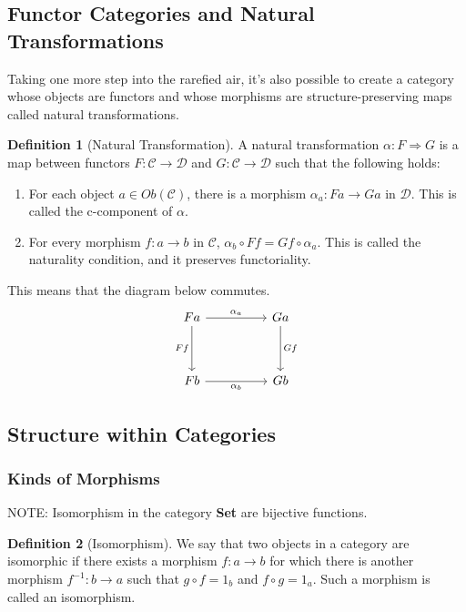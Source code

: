 \documentclass{article}
\theoremstyle{definition}
\newtheorem{definition}{Definition}
\begin{document}
\subsection*{Functor Categories and Natural Transformations}
Taking one more step into the rarefied air, it's also possible to create a category whose objects are functors and whose morphisms are structure-preserving maps called natural transformations.
\begin{definition}[Natural Transformation]
    A natural transformation $\alpha :F\Rightarrow G$ is a map between functors $F:\mathcal{C}\rightarrow\mathcal{D}$ and $G:\mathcal{C}\rightarrow\mathcal{D}$ such that the following holds:
    \begin{enumerate}
        \item For each object $a \in Ob(\mathcal{C})$, there is a morphism $\alpha_a:Fa\rightarrow Ga$ in $\mathcal{D}$. This is called the c-component of $\alpha$.
        \item For every morphism $f:a\rightarrow b$ in $\mathcal{C}$, $\alpha_b\circ Ff=Gf\circ\alpha_a$. This is called the naturality condition, and it preserves functoriality.
    \end{enumerate}

    This means that the diagram below commutes.
    \[\begin{tikzcd}
            Fa && Ga \\
            \\
            Fb && Gb
            \arrow["{\alpha_b}"', from=3-1, to=3-3]
            \arrow["Gf", from=1-3, to=3-3]
            \arrow["Ff"', from=1-1, to=3-1]
            \arrow["{\alpha_a}", from=1-1, to=1-3]
        \end{tikzcd}\]

\end{definition}

\subsection*{Structure within Categories}
\subsubsection*{Kinds of Morphisms}

NOTE: Isomorphism in the category \textbf{Set} are bijective functions.
\begin{definition}[Isomorphism]
    We say that two objects in a category are isomorphic if there exists a morphism $f:a\rightarrow b$ for which there is another morphism $f^{-1}:b\rightarrow a$ such that $g\circ f=1_b$ and $f\circ g=1_a$.
    Such a morphism is called an isomorphism.
\end{definition}
\end{document}

